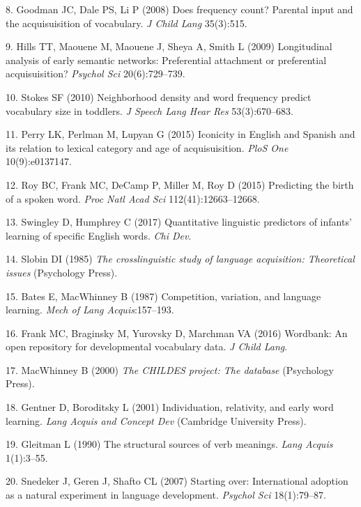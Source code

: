 \documentclass[english,man]{apa6}
\theoremstyle{definition}
\theoremstyle{definition}
\theoremstyle{definition}
\theoremstyle{remark}
\begin{document}
\hypertarget{ref-goodman2008}{}
8. Goodman JC, Dale PS, Li P (2008) Does frequency count? Parental input
and the acquisuisition of vocabulary. \emph{J Child Lang} 35(3):515.

\hypertarget{ref-hills2009}{}
9. Hills TT, Maouene M, Maouene J, Sheya A, Smith L (2009) Longitudinal
analysis of early semantic networks: Preferential attachment or
preferential acquisuisition? \emph{Psychol Sci} 20(6):729--739.

\hypertarget{ref-stokes2010}{}
10. Stokes SF (2010) Neighborhood density and word frequency predict
vocabulary size in toddlers. \emph{J Speech Lang Hear Res}
53(3):670--683.

\hypertarget{ref-perry2015}{}
11. Perry LK, Perlman M, Lupyan G (2015) Iconicity in English and
Spanish and its relation to lexical category and age of acquisuisition.
\emph{PloS One} 10(9):e0137147.

\hypertarget{ref-roy2015}{}
12. Roy BC, Frank MC, DeCamp P, Miller M, Roy D (2015) Predicting the
birth of a spoken word. \emph{Proc Natl Acad Sci} 112(41):12663--12668.

\hypertarget{ref-swingley2017}{}
13. Swingley D, Humphrey C (2017) Quantitative linguistic predictors of
infants' learning of specific English words. \emph{Chi Dev}.

\hypertarget{ref-slobin1985}{}
14. Slobin DI (1985) \emph{The crosslinguistic study of language
acquisition: Theoretical issues} (Psychology Press).

\hypertarget{ref-bates1987}{}
15. Bates E, MacWhinney B (1987) Competition, variation, and language
learning. \emph{Mech of Lang Acquis}:157--193.

\hypertarget{ref-frank2016}{}
16. Frank MC, Braginsky M, Yurovsky D, Marchman VA (2016) Wordbank: An
open repository for developmental vocabulary data. \emph{J Child Lang}.

\hypertarget{ref-macwhinney2000}{}
17. MacWhinney B (2000) \emph{The CHILDES project: The database}
(Psychology Press).

\hypertarget{ref-gentner2001}{}
18. Gentner D, Boroditsky L (2001) Individuation, relativity, and early
word learning. \emph{Lang Acquis and Concept Dev} (Cambridge University
Press).

\hypertarget{ref-gleitman1990}{}
19. Gleitman L (1990) The structural sources of verb meanings.
\emph{Lang Acquis} 1(1):3--55.

\hypertarget{ref-snedeker2007}{}
20. Snedeker J, Geren J, Shafto CL (2007) Starting over: International
adoption as a natural experiment in language development. \emph{Psychol
Sci} 18(1):79--87.
\end{document}
